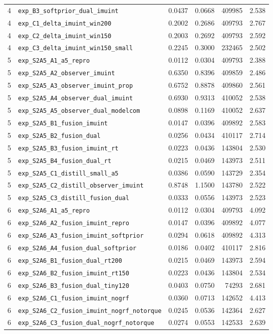 \begin{longtable}{r l r r r r}
4 & \texttt{exp\_B3\_softprior\_dual\_imuint} & 0.0437 & 0.0668 & 409985 & 2.538 \\
4 & \texttt{exp\_C1\_delta\_imuint\_win200} & 0.2002 & 0.2686 & 409793 & 2.767 \\
4 & \texttt{exp\_C2\_delta\_imuint\_win150} & 0.2003 & 0.2692 & 409793 & 2.592 \\
4 & \texttt{exp\_C3\_delta\_imuint\_win150\_small} & 0.2245 & 0.3000 & 232465 & 2.502 \\
5 & \texttt{exp\_S2A5\_A1\_a5\_repro} & 0.0112 & 0.0304 & 409793 & 2.388 \\
5 & \texttt{exp\_S2A5\_A2\_observer\_imuint} & 0.6350 & 0.8396 & 409859 & 2.486 \\
5 & \texttt{exp\_S2A5\_A3\_observer\_imuint\_prop} & 0.6752 & 0.8878 & 409860 & 2.561 \\
5 & \texttt{exp\_S2A5\_A4\_observer\_dual\_imuint} & 0.6930 & 0.9313 & 410052 & 2.538 \\
5 & \texttt{exp\_S2A5\_A5\_observer\_dual\_modelcom} & 0.0898 & 0.1169 & 410052 & 2.637 \\
5 & \texttt{exp\_S2A5\_B1\_fusion\_imuint} & 0.0147 & 0.0396 & 409892 & 2.583 \\
5 & \texttt{exp\_S2A5\_B2\_fusion\_dual} & 0.0256 & 0.0434 & 410117 & 2.714 \\
5 & \texttt{exp\_S2A5\_B3\_fusion\_imuint\_rt} & 0.0223 & 0.0436 & 143804 & 2.530 \\
5 & \texttt{exp\_S2A5\_B4\_fusion\_dual\_rt} & 0.0215 & 0.0469 & 143973 & 2.511 \\
5 & \texttt{exp\_S2A5\_C1\_distill\_small\_a5} & 0.0386 & 0.0590 & 143729 & 2.354 \\
5 & \texttt{exp\_S2A5\_C2\_distill\_observer\_imuint} & 0.8748 & 1.1500 & 143780 & 2.522 \\
5 & \texttt{exp\_S2A5\_C3\_distill\_fusion\_dual} & 0.0333 & 0.0556 & 143973 & 2.523 \\
6 & \texttt{exp\_S2A6\_A1\_a5\_repro} & 0.0112 & 0.0304 & 409793 & 4.092 \\
6 & \texttt{exp\_S2A6\_A2\_fusion\_imuint\_repro} & 0.0147 & 0.0396 & 409892 & 4.077 \\
6 & \texttt{exp\_S2A6\_A3\_fusion\_imuint\_softprior} & 0.0294 & 0.0618 & 409892 & 4.313 \\
6 & \texttt{exp\_S2A6\_A4\_fusion\_dual\_softprior} & 0.0186 & 0.0402 & 410117 & 2.816 \\
6 & \texttt{exp\_S2A6\_B1\_fusion\_dual\_rt200} & 0.0215 & 0.0469 & 143973 & 2.594 \\
6 & \texttt{exp\_S2A6\_B2\_fusion\_imuint\_rt150} & 0.0223 & 0.0436 & 143804 & 2.534 \\
6 & \texttt{exp\_S2A6\_B3\_fusion\_dual\_tiny120} & 0.0403 & 0.0750 & 74293 & 2.681 \\
6 & \texttt{exp\_S2A6\_C1\_fusion\_imuint\_nogrf} & 0.0360 & 0.0713 & 142652 & 4.413 \\
6 & \texttt{exp\_S2A6\_C2\_fusion\_imuint\_nogrf\_notorque} & 0.0245 & 0.0536 & 142364 & 2.627 \\
6 & \texttt{exp\_S2A6\_C3\_fusion\_dual\_nogrf\_notorque} & 0.0274 & 0.0553 & 142533 & 2.639 \\
\bottomrule
\end{longtable}